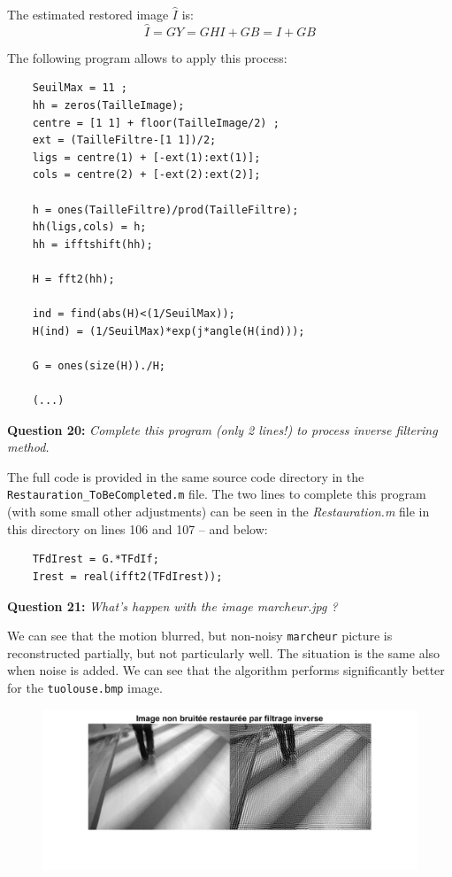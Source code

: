 The estimated restored image $\hat{I}$ is:
\begin{equation}
    \hat{I} = GY = GHI + GB = I + GB
\end{equation}

The following program allows to apply this process:
\begin{lstlisting}
    SeuilMax = 11 ;
    hh = zeros(TailleImage);
    centre = [1 1] + floor(TailleImage/2) ;
    ext = (TailleFiltre-[1 1])/2;
    ligs = centre(1) + [-ext(1):ext(1)];
    cols = centre(2) + [-ext(2):ext(2)];
    
    h = ones(TailleFiltre)/prod(TailleFiltre);
    hh(ligs,cols) = h;
    hh = ifftshift(hh);
    
    H = fft2(hh);
    
    ind = find(abs(H)<(1/SeuilMax));
    H(ind) = (1/SeuilMax)*exp(j*angle(H(ind)));
    
    G = ones(size(H))./H;
    
    (...)
\end{lstlisting}


\textbf{Question 20:}
\textit{Complete this program (only 2 lines!) to process inverse ﬁltering method.}

The full code is provided in the same source code directory in the \texttt{Restauration\_ToBeCompleted.m} file. 
The two lines to complete this program (with some small other adjustments) can be seen in the \textit{Restauration.m} file in this directory on lines 106 and 107 -- and below:
\begin{lstlisting}
    TFdIrest = G.*TFdIf;
    Irest = real(ifft2(TFdIrest));
\end{lstlisting}


\textbf{Question 21:}
\textit{What’s happen with the image marcheur.jpg ?}

We can see that the motion blurred, but non-noisy \texttt{marcheur} picture is reconstructed partially, but not particularly well. The situation is the same also when noise is added. We can see that the algorithm performs significantly better for the \texttt{tuolouse.bmp} image.

\begin{figure}[H]
    \centering
    \includegraphics[width=\linewidth]{Doc/Graphics/Part1/Q21a.png}
\end{figure}

